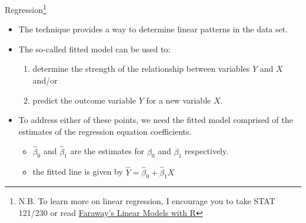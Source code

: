 \documentclass[xcolor=svgnames, handout]{beamer}
\begin{document}
\begin{frame}[label=current]{Regression\footnote{N.B. To learn more on  linear regression, I encourage you to take STAT 121/230 or read \href{https://books.google.ca/books?id=i0DOBQAAQBAJ&printsec=frontcover&dq=Faraway\%27s+Linear+Models+with+R+(2005,+p.+59).\&hl=en\&sa=X\&ved=0ahUKEwinqMbTjq3iAhVhMX0KHedMCnkQ6AEIMjAB\#v=onepage\&q\&f=false}{Faraway's Linear Models with R}}}
\begin{itemize}
\item The technique provides a way to determine linear patterns in the data set.
\medskip
\item The so-called fitted model can be used to:
\begin{enumerate}
\item determine the strength of the relationship between variables $Y$ and $X$ and/or 
\item  predict the outcome variable $Y$ for a new variable $X$.
\end{enumerate}
\medskip
\item To address either of these points, we need the fitted model comprised of the estimates of the regression equation coefficients.
\begin{itemize}
\item  $\hat \beta_0$ and  $\hat \beta_1$ are the estimates for $\beta_0$ and $\beta_1$ respectively.
\item the fitted line is given by $\hat Y =\hat \beta_0 + \hat \beta_1 X$
\end{itemize}
\end{itemize}


\end{frame}
\end{document}
